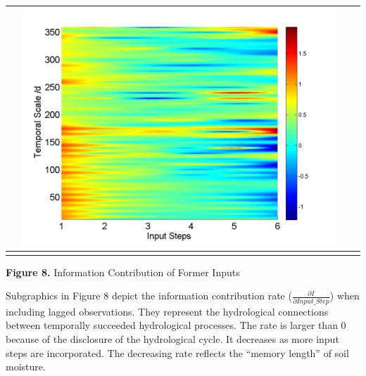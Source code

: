 \documentclass[draft,wrr]{AGUTeX}
\begin{document}
\begin{article}
\begin{table}[H]
\begin{tabular}{cccc}
&\begin{minipage}{.3\textwidth}\includegraphics[width=\linewidth]{resultgraph/06810000qdiff_former.png}\end{minipage}
\\
\hline
\\
\end{tabular}
\Large{\textbf{Figure 8.} Information Contribution of Former Inputs }
\end{table}
Subgraphics in Figure 8 depict the information contribution rate ($\frac{\partial I}{\partial Input\_Step}$) when including lagged observations. They represent the hydrological connections between temporally succeeded hydrological processes. The rate is larger than 0 because of the disclosure of the hydrological cycle. It decreases as more input steps are incorporated. The decreasing rate reflects the ``memory length'' of soil moisture.  



\end{article}
\end{document}
